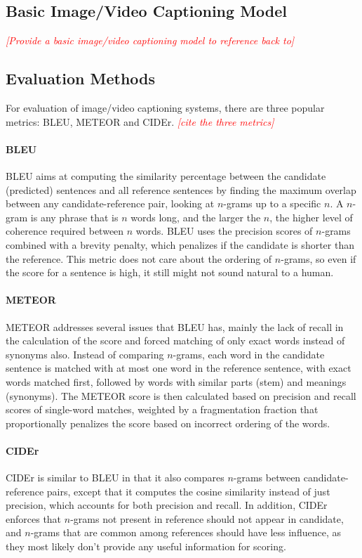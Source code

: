 \documentclass[10pt,twocolumn,letterpaper]{article}
\newcommand{\todo}[1]{\textcolor{red}{{\em [#1]}} }
\begin{document}
\subsection{Basic Image/Video Captioning Model}

\todo{Provide a basic image/video captioning model to reference back to}

\subsection{Evaluation Methods}

For evaluation of image/video captioning systems, there are three popular
metrics: BLEU, METEOR and CIDEr. \todo{cite the three metrics}

\paragraph{BLEU}
BLEU aims at computing the similarity percentage between the candidate
(predicted) sentences and all reference sentences by finding the maximum
overlap between any candidate-reference pair, looking at $n$-grams up to a
specific $n$. A $n$-gram is any phrase that is $n$ words long, and the larger
the $n$, the higher level of coherence required between $n$ words. BLEU uses
the precision scores of $n$-grams combined with a brevity penalty, which
penalizes if the candidate is shorter than the reference. This metric
does not care about the ordering of $n$-grams, so even if the score for a
sentence is high, it still might not sound natural to a human.

\paragraph{METEOR}
METEOR addresses several issues that BLEU has, mainly the lack of recall in
the calculation of the score and forced matching of only exact words instead
of synonyms also. Instead of comparing $n$-grams, each word in the candidate
sentence is matched with at most one word in the reference sentence, with
exact words matched first, followed by words with similar parts (stem) and
meanings (synonyms). The METEOR score is then calculated based on precision
and recall scores of single-word matches, weighted by a fragmentation fraction
that proportionally penalizes the score based on incorrect ordering of the
words.

\paragraph{CIDEr}
CIDEr is similar to BLEU in that it also compares $n$-grams between
candidate-reference pairs, except that it computes the cosine similarity
instead of just precision, which accounts for both precision and recall. In
addition, CIDEr enforces that $n$-grams not present in reference should not
appear in candidate, and $n$-grams that are common among references should
have less influence, as they most likely don't provide any useful information
for scoring.
\end{document}
